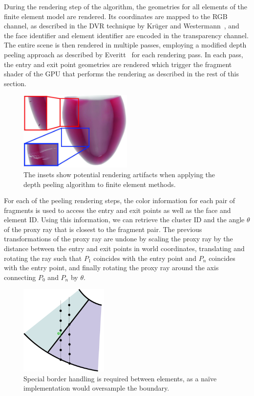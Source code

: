 During the rendering step of the algorithm, the geometries for all elements of the finite element model are rendered.  Its coordinates are mapped to the RGB channel, as described in the DVR technique by Kr\"uger and Westermann~\cite{kruger2003acceleration}, and the face identifier and element identifier are encoded in the transparency channel.  The entire scene is then rendered in multiple passes, employing a modified depth peeling approach as described by Everitt~\cite{everitt2001interactive} for each rendering pass.  In each pass, the entry and exit point geometries are rendered which trigger the fragment shader of the GPU that performs the rendering as described in the rest of this section.

\begin{figure}
    \centering
    \includegraphics[width=0.5\textwidth]{figures/contributions/fem/heartfine.jpg}
    \caption{The insets show potential rendering artifacts when applying the depth peeling algorithm to finite element methods.}
    \label{contributions:fem:peeling}
\end{figure}

For each of the peeling rendering steps, the color information for each pair of fragments is used to access the entry and exit points as well as the face and element ID. Using this information, we can retrieve the cluster ID and the angle $\theta$ of the proxy ray that is closest to the fragment pair.  The previous transformations of the proxy ray are undone by scaling the proxy ray by the distance between the entry and exit points in world coordinates, translating and rotating the ray such that $P_1$ coincides with the entry point and $P_n$ coincides with the entry point, and finally rotating the proxy ray around the axis connecting $P_0$ and $P_n$ by $\theta$.

\begin{figure}
\centering
\includegraphics[width=0.39\textwidth]{figures/contributions/fem/overshoot.pdf}
\caption{Special border handling is required between elements, as a na\"{i}ve implementation would oversample the boundary.}
\label{contributions:fem:overshoot}
\end{figure}


